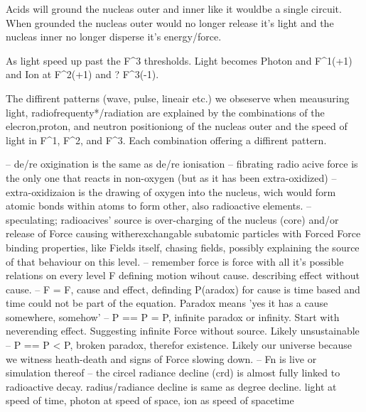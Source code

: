 Acids will ground the nucleas outer and inner like it wouldbe a single circuit. When grounded the nucleas outer would no longer release it's light and the nucleas inner no longer disperse it's energy/force.

As light speed up past the F^3 thresholds. Light becomes Photon and F^1(+1) and Ion at F^2(+1) and ? F^3(-1). 

The diffirent patterns (wave, pulse, lineair etc.) we obseserve when meausuring light, radiofrequenty*/radiation are explained by the combinations of the elecron,proton, 
and neutron positioniong of the nucleas outer and the speed of light in F^1, F^2, and F^3. Each combination offering a diffirent pattern.

-- de/re oxigination is the same as de/re ionisation
-- fibrating radio acive force is the only one that reacts in non-oxygen (but as it has been extra-oxidized)
-- extra-oxidizaion is the drawing of oxygen into the nucleus, wich would form atomic bonds within atoms to form other, also radioactive elements.
-- speculating; radioacives' source is over-charging of the nucleus (core) and/or release of Force causing witherexchangable subatomic particles with Forced Force binding properties,
like Fields itself, chasing fields, possibly explaining the source of that behaviour on this level.
-- remember force is force with all it's possible relations on every level F defining motion wihout cause. describing effect without cause.
-- F = F, cause and effect, definding P(aradox) for cause is time based and time could not be part of the equation. Paradox means 'yes it has a cause somewhere, somehow'
-- P == P = P, infinite paradox or infinity. Start with neverending effect. Suggesting infinite Force without source. Likely unsustainable
-- P == P < P, broken paradox, therefor existence. Likely our universe because we witness heath-death and signs of Force slowing down.
-- Fn is live or simulation thereof
-- the circel radiance decline (crd) is almost fully linked to radioactive decay. radius/radiance decline is same as degree decline.
light at speed of time, photon at speed of space, ion as speed of spacetime



